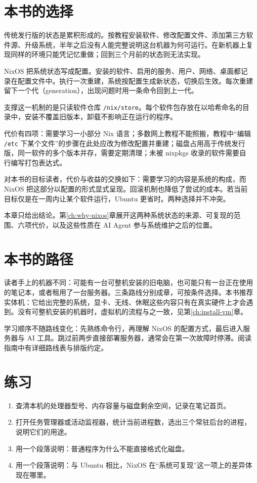\section{本书的选择}

传统发行版的状态是累积形成的。按教程安装软件、修改配置文件、添加第三方软件源、升级系统，半年之后没有人能完整说明这台机器为何可运行。在新机器上复现同样的环境只能凭记忆重做；回到三个月前的状态则无法实现。

NixOS 把系统状态写成配置。安装的软件、启用的服务、用户、网络、桌面都记录在配置文件中。执行一次重建，系统按配置生成新状态，切换后生效。每次重建留下一个代（generation），出现问题时用一条命令回到上一代。

支撑这一机制的是只读软件仓库 \texttt{/nix/store}。每个软件包存放在以哈希命名的目录中，安装不覆盖旧版本，卸载不影响正在运行的程序。

代价有四项：需要学习一小部分 Nix 语言；多数网上教程不能照搬，教程中“编辑 \texttt{/etc} 下某个文件”的步骤在此处应改为修改配置并重建；磁盘占用高于传统发行版，同一软件的多个版本并存，需要定期清理；未被 nixpkgs 收录的软件需要自行编写打包表达式。

对本书的目标读者，代价与收益的交换如下：需要学习的内容是系统的构成，而 NixOS 把这部分以配置的形式显式呈现。回滚机制也降低了尝试的成本。若当前目标仅是在一周内让某个软件运行，Ubuntu 更省时。两种选择并不冲突。

本章只给出结论。第\ref{ch:why-nixos}章展开这两种系统状态的来源、可复现的范围、六项代价，以及这些性质在 AI Agent 参与系统维护之后的位置。

\section{本书的路径}

读者手上的机器不同：可能有一台可整机安装的旧电脑，也可能只有一台正在使用的笔记本，或者租用了一台服务器。三条路线分别成章，可按条件选择。本书推荐实体机：它给出完整的系统，显卡、无线、休眠这些内容只有在真实硬件上才会遇到。没有可整机安装的机器时，虚拟机的流程与之一致，见第\ref{ch:install-vm}章。

学习顺序不随路线变化：先熟练命令行，再理解 NixOS 的配置方式，最后进入服务器与 AI 工具。跳过前两步直接部署服务器，通常会在第一次故障时停滞。阅读指南中有详细路线表与排版约定。

\section{练习}

\begin{enumerate}
  \item 查清本机的处理器型号、内存容量与磁盘剩余空间，记录在笔记首页。
  \item 打开任务管理器或活动监视器，统计当前进程数，选出三个常驻后台的进程，说明它们的用途。
  \item 用一个段落说明：普通程序为什么不能直接格式化磁盘。
  \item 用一个段落说明：与 Ubuntu 相比，NixOS 在“系统可复现”这一项上的差异体现在哪里。
\end{enumerate}

